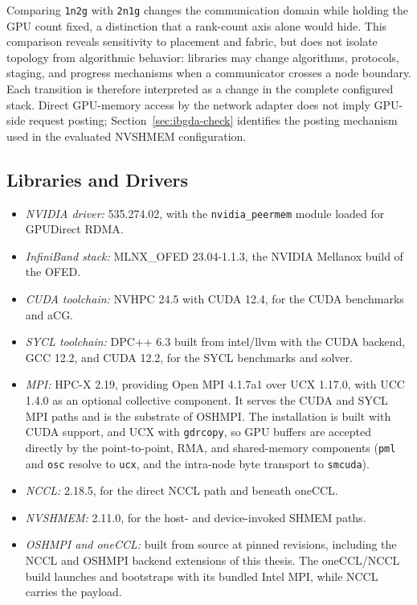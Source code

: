 Comparing \texttt{1n2g} with \texttt{2n1g} changes the communication domain while holding the GPU count fixed, a distinction that a rank-count axis alone would hide. This comparison reveals sensitivity to placement and fabric, but does not isolate topology from algorithmic behavior: libraries may change algorithms, protocols, staging, and progress mechanisms when a communicator crosses a node boundary. Each transition is therefore interpreted as a change in the complete configured stack. Direct GPU-memory access by the network adapter does not imply GPU-side request posting; Section~\ref{sec:ibgda-check} identifies the posting mechanism used in the evaluated NVSHMEM configuration.

\subsection{Libraries and Drivers}

\begin{itemize}
    \item \emph{NVIDIA driver:} 535.274.02, with the \texttt{nvidia\_peermem} module loaded for GPUDirect RDMA.
    \item \emph{InfiniBand stack:} MLNX\_OFED 23.04-1.1.3, the NVIDIA Mellanox build of the \ac{OFED}.
    \item \emph{CUDA toolchain:} \ac{NVHPC} 24.5 with CUDA 12.4, for the CUDA benchmarks and aCG.
    \item \emph{SYCL toolchain:} DPC++ 6.3 built from intel/llvm with the CUDA backend, \ac{GCC} 12.2, and CUDA 12.2, for the SYCL benchmarks and solver.
    \item \emph{MPI:} HPC-X 2.19, providing Open MPI 4.1.7a1 over UCX 1.17.0, with UCC 1.4.0 \cite{ucc_2025} as an optional collective component. It serves the CUDA and SYCL MPI paths and is the substrate of OSHMPI. The installation is built with CUDA support, and UCX with \texttt{gdrcopy}, so GPU buffers are accepted directly by the point-to-point, RMA, and shared-memory components (\texttt{pml} and \texttt{osc} resolve to \texttt{ucx}, and the intra-node byte transport to \texttt{smcuda}).
    \item \emph{NCCL:} 2.18.5, for the direct NCCL path and beneath oneCCL.
    \item \emph{NVSHMEM:} 2.11.0, for the host- and device-invoked SHMEM paths.
    \item \emph{OSHMPI and oneCCL:} built from source at pinned revisions, including the NCCL and OSHMPI backend extensions of this thesis. The oneCCL/NCCL build launches and bootstraps with its bundled Intel MPI, while NCCL carries the payload.
\end{itemize}

